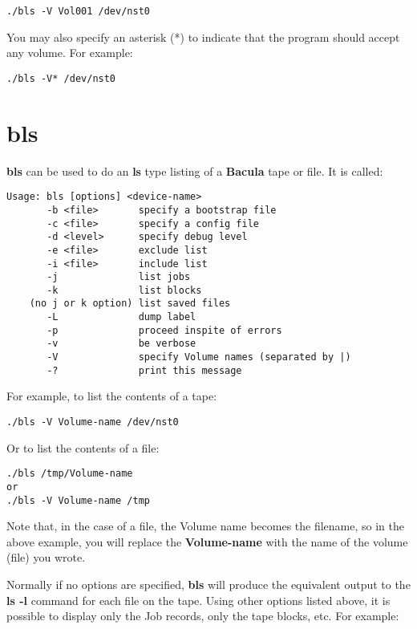 \footnotesize
\begin{verbatim}
./bls -V Vol001 /dev/nst0
\end{verbatim}
\normalsize

You may also specify an asterisk (*) to indicate that the program should
accept any volume. For example: 

\footnotesize
\begin{verbatim}
./bls -V* /dev/nst0
\end{verbatim}
\normalsize

\section{bls}
\label{bls}

{\bf bls} can be used to do an {\bf ls} type listing of a {\bf Bacula} tape or
file. It is called: 

\footnotesize
\begin{verbatim}
Usage: bls [options] <device-name>
       -b <file>       specify a bootstrap file
       -c <file>       specify a config file
       -d <level>      specify debug level
       -e <file>       exclude list
       -i <file>       include list
       -j              list jobs
       -k              list blocks
    (no j or k option) list saved files
       -L              dump label
       -p              proceed inspite of errors
       -v              be verbose
       -V              specify Volume names (separated by |)
       -?              print this message
\end{verbatim}
\normalsize

For example, to list the contents of a tape: 

\footnotesize
\begin{verbatim}
./bls -V Volume-name /dev/nst0
\end{verbatim}
\normalsize

Or to list the contents of a file: 

\footnotesize
\begin{verbatim}
./bls /tmp/Volume-name
or
./bls -V Volume-name /tmp
\end{verbatim}
\normalsize

Note that, in the case of a file, the Volume name becomes the filename, so in
the above example, you will replace the {\bf Volume-name} with the name of the volume
(file) you wrote. 

Normally if no options are specified, {\bf bls} will produce the equivalent
output to the {\bf ls -l} command for each file on the tape. Using other
options listed above, it is possible to display only the Job records, only the
tape blocks, etc. For example: 

